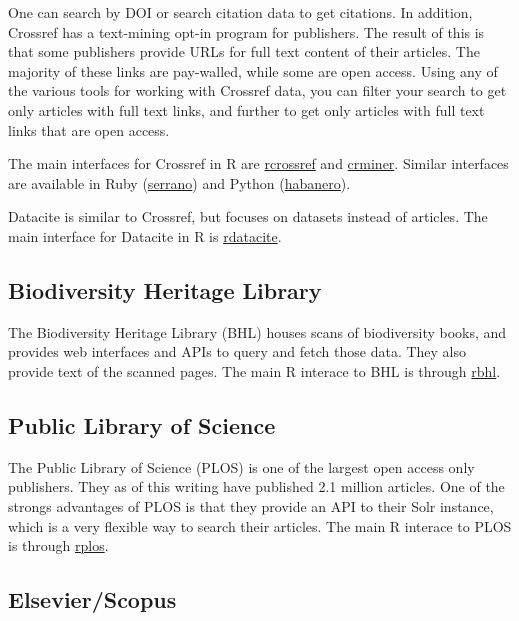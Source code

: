 \documentclass[author-year, review, 11pt]{components/elsarticle} %
\begin{document}
One can search by DOI or search citation data to get citations. In
addition, Crossref has a text-mining opt-in program for publishers. The
result of this is that some publishers provide URLs for full text
content of their articles. The majority of these links are pay-walled,
while some are open access. Using any of the various tools for working
with Crossref data, you can filter your search to get only articles with
full text links, and further to get only articles with full text links
that are open access.

The main interfaces for Crossref in R are
\href{https://github.com/ropensci/rcrossref}{rcrossref} and
\href{https://github.com/ropensci/crminer}{crminer}. Similar interfaces
are available in Ruby
(\href{https://github.com/sckott/serrano}{serrano}) and Python
(\href{https://github.com/sckott/habanero}{habanero}).

Datacite is similar to Crossref, but focuses on datasets instead of
articles. The main interface for Datacite in R is
\href{https://github.com/ropensci/rdatacite}{rdatacite}.

\hypertarget{biodiversity-heritage-library}{%
\subsection{Biodiversity Heritage
Library}\label{biodiversity-heritage-library}}

The Biodiversity Heritage Library (BHL) houses scans of biodiversity
books, and provides web interfaces and APIs to query and fetch those
data. They also provide text of the scanned pages. The main R interace
to BHL is through \href{https://github.com/ropensci/rbhl}{rbhl}.

\hypertarget{public-library-of-science}{%
\subsection{Public Library of Science}\label{public-library-of-science}}

The Public Library of Science (PLOS) is one of the largest open access
only publishers. They as of this writing have published 2.1 million
articles. One of the strongs advantages of PLOS is that they provide an
API to their Solr instance, which is a very flexible way to search their
articles. The main R interace to PLOS is through
\href{https://github.com/ropensci/rplos}{rplos}.

\hypertarget{elsevierscopus}{%
\subsection{Elsevier/Scopus}\label{elsevierscopus}}
\end{document}
